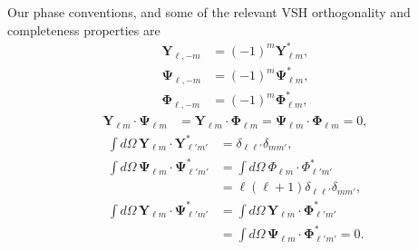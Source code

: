 \documentclass[amsmath,amssymb,aps,10pt,prd,letterpaper,nofootinbib,balancelastpage,notitlepage,superscriptaddress,twocolumn,floatfix]{revtex4-2}
\begin{document}
Our phase conventions, and some of the relevant VSH orthogonality and completeness properties are
\begin{align}
    \bm{Y}_{\ell,-m}&=(-1)^m\bm{Y}_{\ell m}^*,\label{eq:Yminus}\\
    \bm{\Psi}_{\ell,-m}&=(-1)^m\bm{\Psi}_{\ell m}^*,\label{eq:Psiminus}\\
    \bm{\Phi}_{\ell,-m}&=(-1)^m\bm{\Phi}_{\ell m}^*, \label{eq:Phiminus}
\end{align}
\begin{align}
    \bm{Y}_{\ell m}\cdot\bm{\Psi}_{\ell m}&=\bm{Y}_{\ell m}\cdot\bm{\Phi}_{\ell m}=\bm{\Psi}_{\ell m}\cdot\bm{\Phi}_{\ell m}=0,
\end{align}
\begin{align}
    \int d\Omega\,\bm{Y}_{\ell m}\cdot \bm{Y}_{\ell'm'}^*&=\delta_{\ell\ell'}\delta_{mm'},\\
    \int d\Omega\,\bm{\Psi}_{\ell m}\cdot\bm{\Psi}_{\ell'm'}^*&=\int d\Omega~\Phi_{\ell m}\cdot\Phi_{\ell'm'}^*\nonumber \\
	&=\ell(\ell+1)\delta_{\ell\ell'}\delta_{mm'},\\
    \int d\Omega\,\bm{Y}_{\ell m}\cdot\bm{\Psi}_{\ell'm'}^*&=\int d\Omega\,\bm{Y}_{\ell m}\cdot\bm{\Phi}_{\ell'm'}^*\nonumber \\
	&=\int d\Omega\,\bm{\Psi}_{\ell m}\cdot\bm{\Phi}_{\ell'm'}^*=0.
\end{align}
\end{document}
